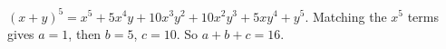 $(x+y)^5=x^5+5x^4y+10x^3y^2+10x^2y^3+5xy^4+y^5$. Matching the $x^5$ terms gives $a=1$, then $b=5$, $c=10$. So $a+b+c=\boxed{16}$.
